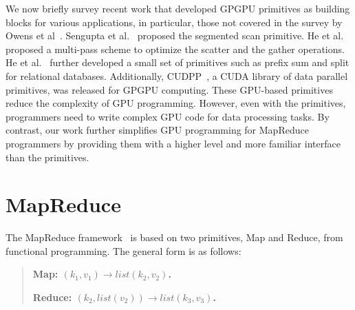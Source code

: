 We now briefly survey recent  work that developed GPGPU primitives as building blocks for various applications, in particular, those not covered in the survey by Owens et al~\cite{Owens2007}.
Sengupta et al.~\cite{Sengupta2007} proposed the segmented scan primitive.
He et al.~\cite{He2007} proposed a multi-pass scheme to optimize the scatter and the gather operations.
He et al.~\cite{He2008a} further developed a small set of primitives such as prefix sum and split for relational databases.
Additionally, CUDPP~\cite{CUDPP}, a CUDA library of data parallel primitives, was released for GPGPU computing.
These GPU-based primitives reduce the complexity of GPU programming.
However, even with the primitives, programmers need to write complex GPU code for data processing tasks.
By contrast, our work further simplifies GPU programming for MapReduce programmers by providing them with a higher level and more familiar interface than the primitives.



\section{MapReduce}
The MapReduce framework~\cite{Dean2008} is based on two primitives, Map and Reduce, from functional programming.
The general form is as follows:
\begin{quote}
\tab \bf{Map:} $(k_1, v_1) \rightarrow list(k_2, v_2)$.

\tab \bf{Reduce:} $(k_2, list(v_2)) \rightarrow list(k_3, v_3)$.
\end{quote}



